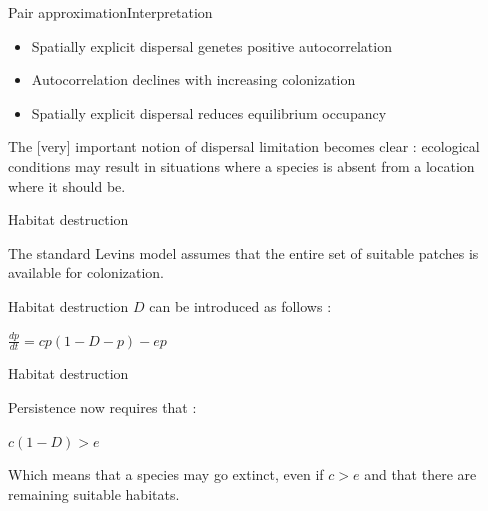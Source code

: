 \documentclass[10pt,aspectratio=149]{beamer}
\newcommand{\keyeq}[1]{%
  \begin{center}
    \Large$\displaystyle #1$
  \end{center}%
}
\begin{document}

\begin{frame}{Pair approximation}{Interpretation}

    \begin{itemize}
        \item Spatially explicit dispersal genetes positive autocorrelation 
        \item Autocorrelation declines with increasing colonization     
        \item Spatially explicit dispersal reduces equilibrium occupancy 
    \end{itemize}
    
    The [very] important notion of dispersal limitation becomes clear : ecological conditions may result in situations where a species is absent from a location where it should be. 

\end{frame}


\begin{frame}{Habitat destruction}

    The standard Levins model assumes that the entire set of suitable patches is available for colonization. 

    Habitat destruction $D$ can be introduced as follows :

    \keyeq{\frac{dp}{dt} = cp(1 - D - p) - ep}

\end{frame}


\begin{frame}{Habitat destruction}

    Persistence now requires that :

    \keyeq{c(1-D)>e}

    Which means that a species may go extinct, even if $c>e$ and that there are remaining suitable habitats.

\end{frame}

\end{document}
